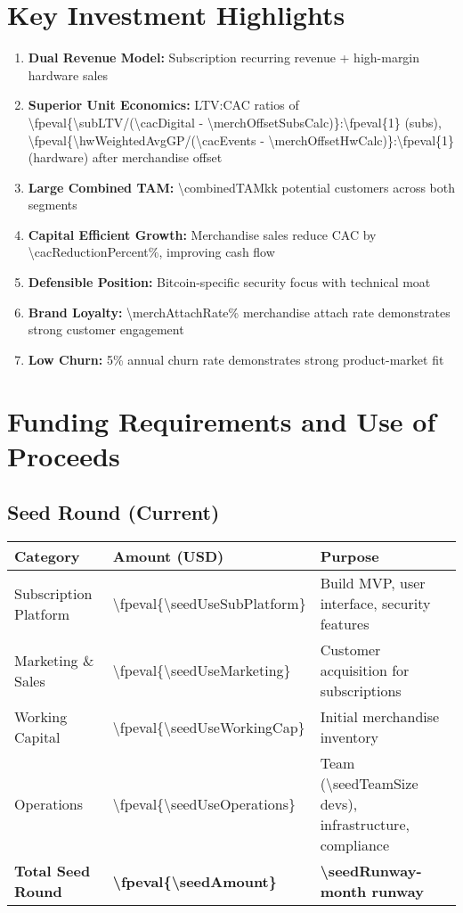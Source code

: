 \documentclass[11pt]{article}
\newcommand{\numint}[1]{\num[round-precision=0]{\fpeval{#1}}}
\begin{document}
\section{Key Investment Highlights}

\begin{enumerate}
  \item \textbf{Dual Revenue Model:} Subscription recurring revenue + high-margin hardware sales
  \item \textbf{Superior Unit Economics:} LTV:CAC ratios of \numint{\subLTV/(\cacDigital - \merchOffsetSubsCalc)}:\numint{1} (subs), \numint{\hwWeightedAvgGP/(\cacEvents - \merchOffsetHwCalc)}:\numint{1} (hardware) after merchandise offset
  \item \textbf{Large Combined TAM:} \num{\combinedTAMk}k potential customers across both segments
  \item \textbf{Capital Efficient Growth:} Merchandise sales reduce CAC by \num{\cacReductionPercent}\%, improving cash flow
  \item \textbf{Defensible Position:} Bitcoin-specific security focus with technical moat
  \item \textbf{Brand Loyalty:} \num{\merchAttachRate}\% merchandise attach rate demonstrates strong customer engagement
  \item \textbf{Low Churn:} \num{5}\% annual churn rate demonstrates strong product-market fit
\end{enumerate}

\section{Funding Requirements and Use of Proceeds}

\subsection{Seed Round (Current)}
\begin{table}[H]
\centering
\begin{tabularx}{\linewidth}{l Y Y}
\toprule
Category & Amount (USD) & Purpose \\\midrule
Subscription Platform & \numint{\seedUseSubPlatform} & Build MVP, user interface, security features \\
Marketing \& Sales & \numint{\seedUseMarketing} & Customer acquisition for subscriptions \\
Working Capital & \numint{\seedUseWorkingCap} & Initial merchandise inventory \\
Operations & \numint{\seedUseOperations} & Team (\num{\seedTeamSize} devs), infrastructure, compliance \\
\textbf{Total Seed Round} & \textbf{\numint{\seedAmount}} & \textbf{\num{\seedRunway}-month runway} \\
\bottomrule
\end{tabularx}
\end{table}
\end{document}
